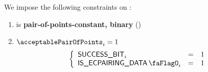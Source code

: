 We impose the following constraints on \acceptablePairOfPoints{}:
\begin{enumerate}
    \item \acceptablePairOfPoints{} is \textbf{pair-of-points-constant, binary} \quad (\trash)
    \item \If $\acceptablePairOfPoints_{i} = 1$ \Then
        \[
            \left\{ \begin{array}{lcl}
                \ecdataSuccessBit _{i} & = & 1 \\
                \isEcpairingData  _{i} & = & 1 \\
            \end{array} \right.
        \]
\end{enumerate}
